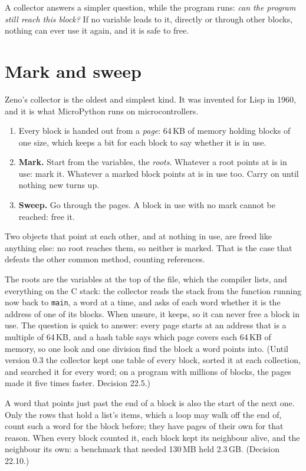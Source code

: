 A collector answers a simpler question, while the program runs:
\emph{can the program still reach this block?} If no variable leads to
it, directly or through other blocks, nothing can ever use it again,
and it is safe to free.

\section{Mark and sweep}

Zeno's collector is the oldest and simplest kind. It was invented for
Lisp in 1960, and it is what MicroPython runs on microcontrollers.

\begin{enumerate}
\item Every block is handed out from a \emph{page}: 64\,KB of memory
  holding blocks of one size, which keeps a bit for each block to say
  whether it is in use.
\item \textbf{Mark.} Start from the variables, the \emph{roots}.
  Whatever a root points at is in use: mark it. Whatever a marked block
  points at is in use too. Carry on until nothing new turns up.
\item \textbf{Sweep.} Go through the pages. A block in use with no
  mark cannot be reached: free it.
\end{enumerate}

Two objects that point at each other, and at nothing in use, are freed
like anything else: no root reaches them, so neither is marked. That
is the case that defeats the other common method, counting references.

The roots are the variables at the top of the file, which the compiler
lists, and everything on the C stack: the collector reads the stack
from the function running now back to \verb|main|, a word at a time,
and asks of each word whether it is the address of one of its blocks.
When unsure, it keeps, so it can never free a block in use. The
question is quick to answer: every page starts at an address that is a
multiple of 64\,KB, and a hash table says which page covers each 64\,KB
of memory, so one look and one division find the block a word points
into. (Until version 0.3 the collector kept one table of every block,
sorted it at each collection, and searched it for every word; on a
program with millions of blocks, the pages made it five times faster.
Decision 22.5.)

A word that points just past the end of a block is also the start of
the next one. Only the rows that hold a list's items, which a loop may
walk off the end of, count such a word for the block before; they have
pages of their own for that reason. When every block counted it, each
block kept its neighbour alive, and the neighbour its own: a benchmark
that needed 130\,MB held 2.3\,GB. (Decision 22.10.)


